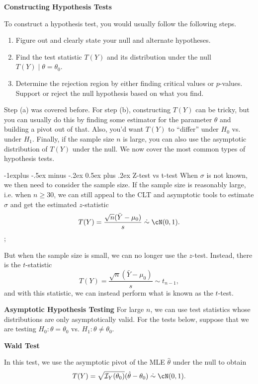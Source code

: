 \documentclass[10pt,landscape]{article}
\makeatletter
\renewcommand{\subsection}{\@startsection{subsection}{2}{0mm}%
                                {-1explus -.5ex minus -.2ex}%
                                {0.5ex plus .2ex}%
                                {\normalfont\normalsize\bfseries}}
\makeatother
\begin{document}
\begin{multicols*}{3}
\textbf{Constructing Hypothesis Tests}

To construct a hypothesis test, you would usually follow the following steps.
\begin{enumerate}
    \item Figure out and clearly state your null and alternate hypotheses.
    \item  Find the test statistic $T(Y)$ and its distribution under the null $T(Y)\mid \theta = \theta_0$.
    \item Determine the rejection region by either finding critical values or $p$-values. Support or reject the null hypothesis based on what you find.
\end{enumerate}

Step (a) was covered before. For step (b), constructing $T(Y)$ can be tricky, but you can usually do this by finding some estimator for the parameter $\theta$ and building a pivot out of that. Also, you'd want $T(Y)$ to ``differ'' under $H_0$ vs. under $H_1$. Finally, if the sample size $n$ is large, you can also use the asymptotic distribution of $T(Y)$ under the null. We now cover the most common types of hypothesis tests.

\subsection{Z-test vs t-test}
When $\sigma$ is not known, we then need to consider the sample size. If the sample size is reasonably large, i.e. when $n\geq 30$, we can still appeal to the CLT and asymptotic tools to estimate $\sigma$ and get the estimated $z$-statistic $$T(Y) =\frac{\sqrt{n}(\bar{Y}-\mu_0)}{s}\mathrel{\dot\sim} \cN(0,1).$$;

But when the sample size is small, we can no longer use the $z$-test. Instead, there is the $t$-statistic $$T(Y)=\frac{\sqrt{n}(\bar{Y}-\mu_0)}{s}\sim t_{n-1},$$ and with this statistic, we can instead perform what is known as the $t$-test. 

\textbf{Asymptotic Hypothesis Testing}
For large $n$, we can use test statistics whose distributions are only asymptotically valid. For the tests below, suppose that we are testing $H_0:\theta = \theta_0$ vs. $H_1:\theta \neq \theta_0$.

\textbf{Wald Test}

In this test, we use the asymptotic pivot of the MLE $\hat{\theta}$ under the null to obtain $$T(Y)=\sqrt{\mathcal{I}_Y(\theta_0)}(\hat{\theta}-\theta_0)\mathrel{\dot\sim} \cN(0,1).$$


\end{multicols*}
\end{document}
